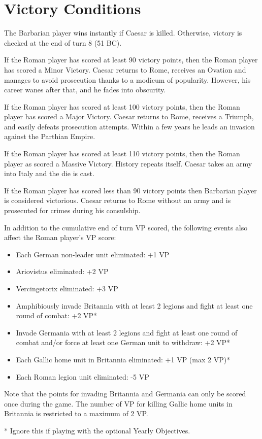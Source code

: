 \section{Victory Conditions}
\par
The Barbarian player wins instantly if Caesar is killed. Otherwise, victory is checked at the end of turn 8 (51 BC).

If the Roman player has scored at least 90 victory points, then the Roman player has scored a Minor Victory. Caesar returns to Rome, receives an Ovation and manages to avoid prosecution thanks to a modicum of popularity. However, his career wanes after that, and he fades into obscurity.

If the Roman player has scored at least 100 victory points, then the Roman player has scored a Major Victory. Caesar returns to Rome, receives a Triumph, 
and easily defeats prosecution attempts. Within a few years he leads an invasion against the Parthian Empire.

If the Roman player has scored at least 110 victory points, then the Roman player as scored a Massive Victory. History repeats itself. Caesar takes an army into Italy and the die is cast.

If the Roman player has scored less than 90 victory points then Barbarian player is considered victorious. Caesar returns to Rome without an army and is prosecuted for crimes during his consulship.

In addition to the cumulative end of turn VP scored, the following events also affect the Roman player's VP score:

\begin{itemize}
  \setlength\itemsep{0em}
  \item Each German non-leader unit eliminated: +1 VP
  \item Ariovistus eliminated: +2 VP
  \item Vercingetorix eliminated: +3 VP
  \item Amphibiously invade Britannia with at least 2 legions and fight at least one round of combat: +2 VP*
  \item Invade Germania with at least 2 legions and fight at least one round of combat and/or force at least one German unit to withdraw: +2 VP*
  \item Each Gallic home unit in Britannia eliminated: +1 VP (max 2 VP)*
  \item Each Roman legion unit eliminated: -5 VP
\end{itemize}

Note that the points for invading Britannia and Germania can only be scored once during the game. The number of VP for killing Gallic home units in Britannia is restricted to a maximum of 2 VP.

* Ignore this if playing with the optional Yearly Objectives.